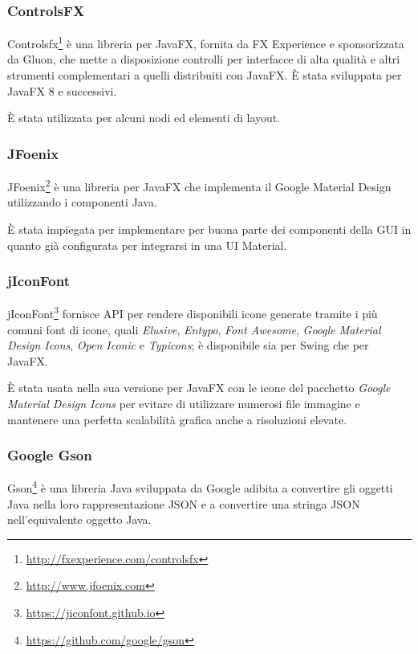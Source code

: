             \subsubsection{ControlsFX}\label{subsub:controlsfx}
                Controlsfx\footnote{\url{http://fxexperience.com/controlsfx}} è una libreria  per JavaFX, fornita da FX Experience e sponsorizzata da Gluon, che mette a disposizione controlli per interfacce di alta qualità e altri strumenti complementari a quelli distribuiti con JavaFX.
                È stata sviluppata per JavaFX 8 e successivi.

                È stata utilizzata per alcuni nodi ed elementi di layout.

            \subsubsection{JFoenix}\label{subsub:jfoenix}
                JFoenix\footnote{\url{http://www.jfoenix.com}} è una libreria  per JavaFX che implementa il Google Material Design utilizzando i componenti Java.

                È stata impiegata per implementare per buona parte dei componenti della GUI in quanto già configurata per integrarsi in una UI Material.

            \subsubsection{jIconFont}\label{subsub:jiconfont}
                jIconFont\footnote{\url{https://jiconfont.github.io}} fornisce API per rendere disponibili icone generate tramite i più comuni font di icone, quali \emph{Elusive}, \emph{Entypo}, \emph{Font Awesome}, \emph{Google Material Design Icons}, \emph{Open Iconic} e \emph{Typicons}; è disponibile sia per Swing che per JavaFX.

                È stata usata nella sua versione per JavaFX con le icone del pacchetto \emph{Google Material Design Icons} per evitare di utilizzare numerosi file immagine e mantenere una perfetta scalabilità grafica anche a risoluzioni elevate.

            \subsubsection{Google Gson}\label{subsub:gson}
                Gson\footnote{\url{https://github.com/google/gson}} è una libreria Java  sviluppata da Google adibita a convertire gli oggetti Java nella loro rappresentazione JSON e a convertire una stringa JSON nell'equivalente oggetto Java.

